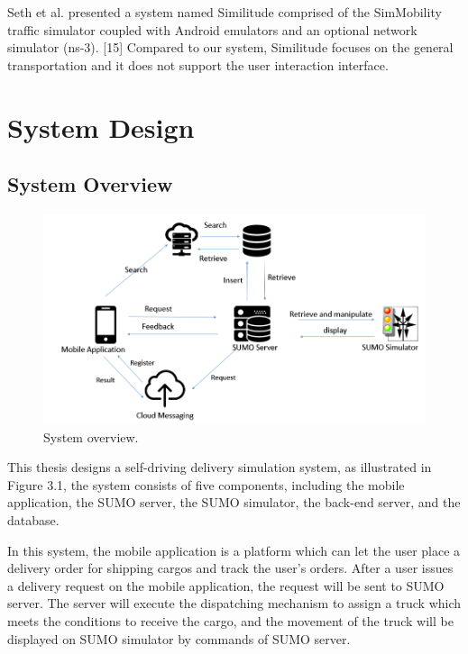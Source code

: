 \documentclass[12pt]{ksthesis}
\begin{document}
\begin{thesis}
{Seth et al. presented a system named Similitude comprised of the SimMobility traffic simulator coupled with Android emulators and an optional network simulator (ns-3). [15] Compared to our system, Similitude focuses on the general transportation and it does not support the user interaction interface.




\chapter{System Design}\label{Chap:System_design}


\section{System Overview}

\begin{figure}[H]
\centering
\includegraphics[width=1.0\textwidth]{./figures/F3-1_SystemOverview.PNG}
\caption{\large System overview.}
\vspace{0.5cm}
\label{Fig:system_Overview}
\end{figure}

This thesis designs a self-driving delivery simulation system, as illustrated in Figure 3.1, the system consists of five components, including the mobile application, the SUMO server, the SUMO simulator, the back-end server, and the database. 

In this system, the mobile application is a platform which can let the user place a delivery order for shipping cargos and track the user’s orders. After a user issues a delivery request on the mobile application, the request will be sent to SUMO server. The server will execute the dispatching mechanism to assign a truck which meets the conditions to receive the cargo, and the movement of the truck will be displayed on SUMO simulator by commands of SUMO server. 

}
\end{thesis}
\end{document}
